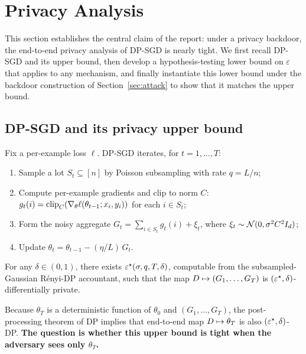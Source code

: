 \section{Privacy Analysis}
\label{sec:privacy}

This section establishes the central claim of the report: under a privacy backdoor, the end-to-end privacy analysis of DP-SGD is nearly tight. We first recall DP-SGD and its upper bound, then develop a hypothesis-testing lower bound on $\varepsilon$ that applies to any mechanism, and finally instantiate this lower bound under the backdoor construction of Section~\ref{sec:attack} to show that it matches the upper bound.

\subsection{DP-SGD and its privacy upper bound}
\label{sec:dpsgd}

Fix a per-example loss $\ell$. DP-SGD \citep{abadi2016deep} iterates, for $t=1, \ldots, T$:
\begin{enumerate}[label=(\roman*), leftmargin=*, itemsep=2pt, topsep=2pt]
  \item Sample a lot $S_t \subseteq [n]$ by Poisson subsampling with rate
    $q = L/n$;
  \item Compute per-example gradients and clip to norm $C$:
    $g_t(i) = \mathrm{clip}_C\!\left(\nabla_\theta \ell(\theta_{t-1}; x_i, y_i)\right)$
    for each $i \in S_t$;
  \item Form the noisy aggregate
    $G_t = \sum_{i \in S_t} g_t(i) + \xi_t$, where
    $\xi_t \sim \mathcal{N}(0, \sigma^2 C^2 I_d)$;
  \item Update $\theta_t = \theta_{t-1} - (\eta/L)\, G_t$.
\end{enumerate}

\begin{theorem}
\label{thm:upper}
For any $\delta \in (0, 1)$, there exists $\varepsilon^\star(\sigma, q, T, \delta)$, computable from the subsampled-Gaussian R\'enyi-DP accountant,
such that the map $D \mapsto (G_1, \ldots, G_T)$ is $(\varepsilon^\star,
\delta)$-differentially private.
\end{theorem}

Because $\theta_T$ is a deterministic function of $\theta_0$ and $(G_1, \ldots, G_T)$, the post-processing theorem of DP \citep{dwork2014algorithmic} implies that end-to-end map $D \mapsto \theta_T$ is also $(\varepsilon^\star, \delta)$-DP. \textbf{The question is whether this upper bound is tight when the adversary sees only $\theta_T$.}

